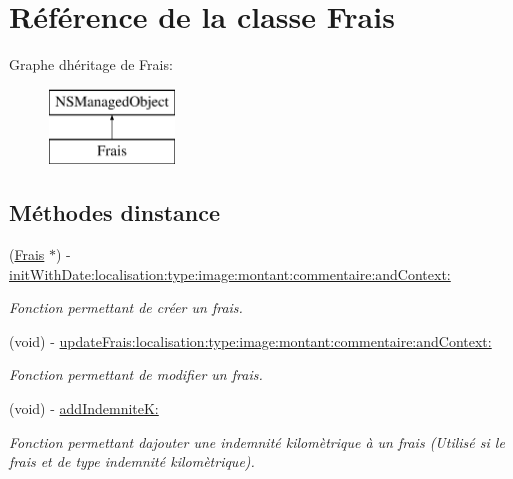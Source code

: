 \hypertarget{interface_frais}{}\section{Référence de la classe Frais}
\label{interface_frais}
Graphe d\textquotesingle{}héritage de Frais\+:\begin{figure}[H]
\begin{center}
\leavevmode
\includegraphics[height=2.000000cm]{interface_frais}
\end{center}
\end{figure}
\subsection*{Méthodes d\textquotesingle{}instance}
\begin{DoxyCompactItemize}
\item 
(\hyperlink{interface_frais}{Frais} $\ast$) -\/ \hyperlink{interface_frais_a29457909591bf30736c9c59d835acc50}{init\+With\+Date\+:localisation\+:type\+:image\+:montant\+:commentaire\+:and\+Context\+:}
\begin{DoxyCompactList}\small\item\em Fonction permettant de créer un frais. \end{DoxyCompactList}\item 
(void) -\/ \hyperlink{interface_frais_ac633bc42fb134ed7386255d789d5dbd0}{update\+Frais\+:localisation\+:type\+:image\+:montant\+:commentaire\+:and\+Context\+:}
\begin{DoxyCompactList}\small\item\em Fonction permettant de modifier un frais. \end{DoxyCompactList}\item 
(void) -\/ \hyperlink{interface_frais_a167e8a8bc4944d05418814431c8b1928}{add\+Indemnite\+K\+:}
\begin{DoxyCompactList}\small\item\em Fonction permettant d\textquotesingle{}ajouter une indemnité kilomètrique à un frais (Utilisé si le frais et de type indemnité kilomètrique). \end{DoxyCompactList}\end{DoxyCompactItemize}
